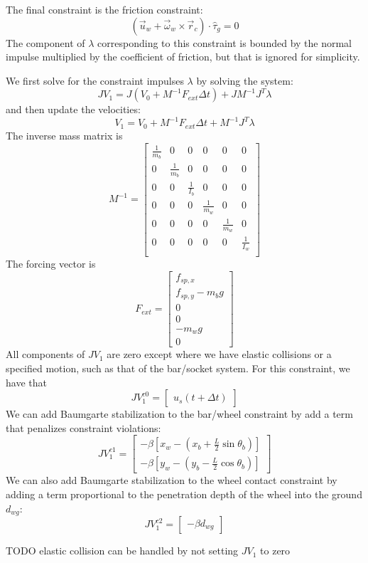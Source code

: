 \documentclass[9pt]{article}
\begin{document}
The final constraint is the friction constraint: 
\[
(\vec{u}_w + \vec{\omega}_w \times \vec{r}_c) \cdot \hat{\tau}_g = 0
\]
The component of $\lambda$ corresponding to this constraint is bounded by the normal impulse multiplied by the coefficient of friction, but that is ignored for simplicity.

We first solve for the constraint impulses $\lambda$ by solving the system:
\[
J V_1 = J (V_0 + M^{-1} F_{ext} \Delta t) + J M^{-1} J^T \lambda
\]
and then update the velocities:
\[
V_1 = V_0 + M^{-1} F_{ext} \Delta t + M^{-1} J^T \lambda
\]
The inverse mass matrix is 
\[
M^{-1} = 
\left[
\begin{array}{cccccc}
\frac{1}{m_b} & 0 & 0 & 0 & 0 & 0 \\
0 & \frac{1}{m_b} & 0 & 0 & 0 & 0 \\
0 & 0 & \frac{1}{I_b} & 0 & 0 & 0 \\
0 & 0 & 0 & \frac{1}{m_w} & 0 & 0 \\
0 & 0 & 0 & 0 & \frac{1}{m_w} & 0 \\
0 & 0 & 0 & 0 & 0 & \frac{1}{I_w} \\
\end{array} 
\right]
\]
The forcing vector is 
\[
F_{ext} = 
\left[
\begin{array}{c}
f_{sp,x} \\
f_{sp,y} - m_b g \\
0 \\
0 \\
-m_w g \\
0
\end{array} 
\right]
\]
All components of $JV_1$ are zero except where we have elastic collisions or a specified motion, such as that of the bar/socket system. For this constraint, we have that 
\[
JV_1^{c0} = 
\left[
\begin{array}{c}
u_s(t + \Delta t)
\end{array} 
\right]
\]
We can add Baumgarte stabilization to the bar/wheel constraint by add a term that penalizes constraint violations:
\[
JV_1^{c1} = 
\left[
\begin{array}{c}
-\beta \left[x_w - \left(x_b + \frac{L}{2}\sin \theta_b\right)\right] \\
-\beta \left[y_w - \left(y_b - \frac{L}{2}\cos \theta_b\right)\right]
\end{array} 
\right]
\]
We can also add Baumgarte stabilization to the wheel contact constraint by adding a term proportional to the penetration depth of the wheel into the ground $d_{wg}$:
\[
JV_1^{c2} = 
\left[
\begin{array}{c}
-\beta d_{wg}
\end{array} 
\right]
\]

TODO elastic collision can be handled by not setting $JV_1$ to zero
\end{document}
